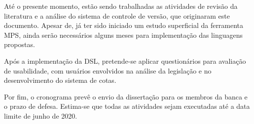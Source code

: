 Até o presente momento, estão sendo trabalhadas as atividades de revisão da literatura e a análise do sistema de controle de versão, que originaram este documento. Apesar de, já ter sido iniciado um estudo superficial da ferramenta \gls{MPS}, ainda serão necessários alguns meses para implementação das linguagens propostas.

Após a implementação da \gls{DSL}, pretende-se aplicar questionários para avaliação de usabilidade, com usuários envolvidos na análise da legislação e no desenvolvimento do sistema de cotas.

Por fim, o cronograma prevê o envio da dissertação para os membros da banca e o prazo de defesa. Estima-se que todas as atividades sejam executadas até a data limite de junho de 2020.